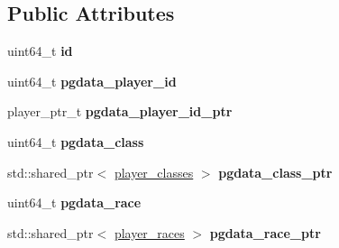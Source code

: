 \subsection*{Public Attributes}
\begin{DoxyCompactItemize}
\item 
\mbox{\label{structmods_1_1orm_1_1player__generated__data_ac15fdad6a5b11ce9789f82264b7be075}} 
uint64\+\_\+t {\bfseries id}
\item 
\mbox{\label{structmods_1_1orm_1_1player__generated__data_a6cb676401f4987e1445b4c1377b85524}} 
uint64\+\_\+t {\bfseries pgdata\+\_\+player\+\_\+id}
\item 
\mbox{\label{structmods_1_1orm_1_1player__generated__data_ae5c3286ecbb1967f1b0f84886378ea19}} 
player\+\_\+ptr\+\_\+t {\bfseries pgdata\+\_\+player\+\_\+id\+\_\+ptr}
\item 
\mbox{\label{structmods_1_1orm_1_1player__generated__data_aac8cd5a1aecc2916b5a5a8e50290e733}} 
uint64\+\_\+t {\bfseries pgdata\+\_\+class}
\item 
\mbox{\label{structmods_1_1orm_1_1player__generated__data_a0a2abe84aac191e98083918e824e806f}} 
std\+::shared\+\_\+ptr$<$ \hyperlink{structmods_1_1orm_1_1player__classes}{player\+\_\+classes} $>$ {\bfseries pgdata\+\_\+class\+\_\+ptr}
\item 
\mbox{\label{structmods_1_1orm_1_1player__generated__data_ab33545f6e647d1708347ccc26c5b5a4f}} 
uint64\+\_\+t {\bfseries pgdata\+\_\+race}
\item 
\mbox{\label{structmods_1_1orm_1_1player__generated__data_a819b52a2a75df6245ad32db00b24fe7b}} 
std\+::shared\+\_\+ptr$<$ \hyperlink{structmods_1_1orm_1_1player__races}{player\+\_\+races} $>$ {\bfseries pgdata\+\_\+race\+\_\+ptr}
\item 
\mbox{\label{structmods_1_1orm_1_1player__generated__data_a5e9eca1fe6cf8a4e6915abcaace0905e}} 

\end{DoxyCompactItemize}
